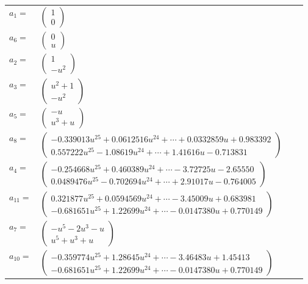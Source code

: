 \documentclass[1p]{elsarticle_modified}
\theoremstyle{definition}
\begin{document}
\begin{tabular}{m{7pt} m{180pt} m{7pt} m{180pt} }
\flushright $a_{1}=$&$\begin{pmatrix}1\\0\end{pmatrix}$ \\
\flushright $a_{6}=$&$\begin{pmatrix}0\\u\end{pmatrix}$ \\
\flushright $a_{2}=$&$\begin{pmatrix}1\\- u^2\end{pmatrix}$ \\
\flushright $a_{3}=$&$\begin{pmatrix}u^2+1\\- u^2\end{pmatrix}$ \\
\flushright $a_{5}=$&$\begin{pmatrix}- u\\u^3+u\end{pmatrix}$ \\
\flushright $a_{8}=$&$\begin{pmatrix}-0.339013 u^{25}+0.0612516 u^{24}+\cdots+0.0332859 u+0.983392\\0.557222 u^{25}-1.08619 u^{24}+\cdots+1.41616 u-0.713831\end{pmatrix}$ \\
\flushright $a_{4}=$&$\begin{pmatrix}-0.254668 u^{25}+0.460389 u^{24}+\cdots-3.72725 u-2.65550\\0.0489476 u^{25}-0.702694 u^{24}+\cdots+2.91017 u-0.764005\end{pmatrix}$ \\
\flushright $a_{11}=$&$\begin{pmatrix}0.321877 u^{25}+0.0594569 u^{24}+\cdots-3.45009 u+0.683981\\-0.681651 u^{25}+1.22699 u^{24}+\cdots-0.0147380 u+0.770149\end{pmatrix}$ \\
\flushright $a_{7}=$&$\begin{pmatrix}- u^5-2 u^3- u\\u^5+u^3+u\end{pmatrix}$ \\
\flushright $a_{10}=$&$\begin{pmatrix}-0.359774 u^{25}+1.28645 u^{24}+\cdots-3.46483 u+1.45413\\-0.681651 u^{25}+1.22699 u^{24}+\cdots-0.0147380 u+0.770149\end{pmatrix}$ \\

\end{tabular}
\end{document}
